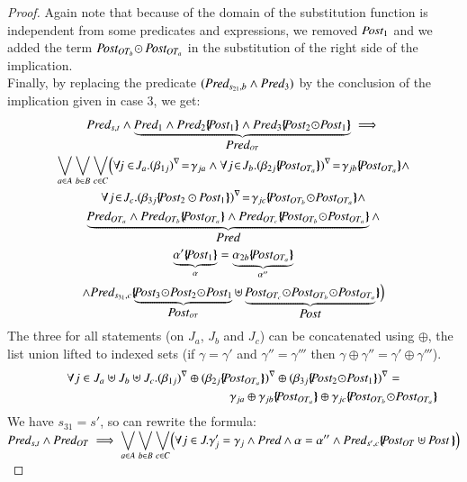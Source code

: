 \documentclass{elsarticle}
\newcommand{\shortodot}{\!\odot\!}
\begin{document}
\begin{proof}
Again note that because of the domain  of the substitution function is independent from some predicates and expressions, we removed $\Post_1$ and  we  added the term $\Post_{OT_{b}}\shortodot\,\Post_{OT_a}$ in the substitution of the right side of the implication.\\
Finally, by replacing the predicate $(\Pred_{s_{21},b} \land  \Pred_3)$
by the conclusion of the  implication given in case 3, we get:
\begin{multline*}\Pred_{s,t} \land \underbrace{\Pred_1\land \Pred_2\subst{\Post_1} \land \Pred_3\subst{\Post_2\shortodot\Post_1}}_{\Pred_{OT}}\implies\\
 {\bigvee_{a\in A}}\, {\bigvee_{b\in B}}\, {\bigvee_{c\in C}} 
\Big(\forall\! j\in\! J_a.\vis{\beta_{1j}}\!=\!\gamma_{ja} \land  \forall j \!\in\! J_{b}.\vis{\beta_{2j}\subst{\Post_{OT_a}}}\!=\!\gamma_{jb} \subst{\Post_{OT_a}}  \land \\
 \forall j\!\in\! J_{c}. \vis{\beta_{3j} \subst{\Post_2\,\shortodot\,\Post_1}} \!=\!\gamma_{jc} \subst{\Post_{OT_{b}}\shortodot\Post_{OT_a}}  \land\\
   \underbrace{\Pred_{OT_a}\land\Pred_{OT_{b}} \subst{\Post_{OT_a}} \land 
  \Pred_{OT_{c}}\subst{\Post_{OT_{b}}\shortodot\Post_{OT_a}}}_{\Pred} \land\\  \underbrace{\alpha'\subst{\Post_1}}_{\alpha}=\underbrace{\alpha_{2 b} \subst{\Post_{OT_a}}}_{\alpha''} \\\land \Pred_{s_{31},c}  \subst{\underbrace{\Post_3\shortodot\Post_2\shortodot\Post_1}_{\Post_{OT}}\uplus \underbrace{\Post_{OT_{c}}\shortodot \Post_{OT_{b}}\shortodot\Post_{OT_a}}_{\Post}}\Big)
\end{multline*}
The three for all statements (on $J_a$, $J_b$ and $J_c$) can be concatenated using $\oplus$, the list union lifted to indexed sets (if $\gamma=\gamma'$ and $\gamma''=\gamma'''$ then $\gamma\oplus\gamma''=\gamma'\oplus\gamma'''$).
\begin{multline*}\forall j\in J_a\uplus J_b\uplus J_c.  \vis{\beta_{1j}}\oplus \vis{\beta_{2j}\subst{\Post_{OT_a}}}\oplus \vis{\beta_{3j} \subst{\Post_2\shortodot\Post_1}}=\\ ~\hspace{5.5cm} \gamma_{j a} \oplus \gamma_{jb} \subst{\Post_{OT_a}}  \oplus \gamma_{jc} \subst{\Post_{OT_{b}}\shortodot\Post_{OT_a}}
\end{multline*}
We have  $s_{31}=s'$, so can rewrite the formula:\\
$\Pred_{s,t} \land \Pred_{OT}\implies
\displaystyle{\bigvee_{a\in A}}\, \displaystyle{\bigvee_{b\in B}}\, \displaystyle{\bigvee_{c\in C}} 
\Big(\forall j\in J.\gamma_j'=\gamma_j \land  \Pred \land \alpha=\alpha''  \land \Pred_{s',c}\subst{\Post_{OT}\uplus\Post\,}\Big)$\\


\end{proof}
\end{document}
